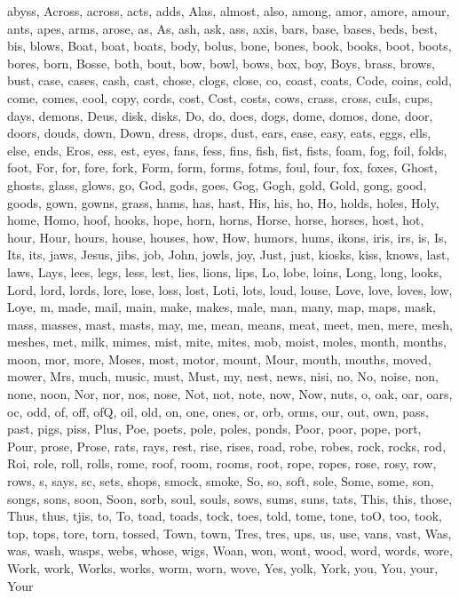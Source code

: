{abyss, Across, across, acts, adds, Alas, almost, also, among, amor, amore, amour, ants, apes, arms, arose, as, As, ash, ask, ass, axis, bars, base, bases, beds, best, bis, blows, Boat, boat, boats, body, bolus, bone, bones, book, books, boot, boots, bores, born, Bosse, both, bout, bow, bowl, bows, box, boy, Boys, brass, brows, bust, case, cases, cash, cast, chose, clogs, close, co, coast, coats, Code, coins, cold, come, comes, cool, copy, cords, cost, Cost, costs, cows, crass, cross, cuIs, cups, days, demons, Deus, disk, disks, Do, do, does, dogs, dome, domos, done, door, doors, douds, down, Down, dress, drops, dust, ears, ease, easy, eats, eggs, ells, else, ends, Eros, ess, est, eyes, fans, fess, fins, fish, fist, fists, foam, fog, foil, folds, foot, For, for, fore, fork, Form, form, forms, fotms, foul, four, fox, foxes, Ghost, ghosts, glass, glows, go, God, gods, goes, Gog, Gogh, gold, Gold, gong, good, goods, gown, gowns, grass, hams, has, hast, His, his, ho, Ho, holds, holes, Holy, home, Homo, hoof, hooks, hope, horn, horns, Horse, horse, horses, host, hot, hour, Hour, hours, house, houses, how, How, humors, hums, ikons, iris, irs, is, Is, Its, its, jaws, Jesus, jibs, job, John, jowls, joy, Just, just, kiosks, kiss, knows, last, laws, Lays, lees, legs, less, lest, lies, lions, lips, Lo, lobe, loins, Long, long, looks, Lord, lord, lords, lore, lose, loss, lost, Loti, lots, loud, louse, Love, love, loves, low, Loye, m, made, mail, main, make, makes, male, man, many, map, maps, mask, mass, masses, mast, masts, may, me, mean, means, meat, meet, men, mere, mesh, meshes, met, milk, mimes, mist, mite, mites, mob, moist, moles, month, months, moon, mor, more, Moses, most, motor, mount, Mour, mouth, mouths, moved, mower, Mrs, much, music, must, Must, my, nest, news, nisi, no, No, noise, non, none, noon, Nor, nor, nos, nose, Not, not, note, now, Now, nuts, o, oak, oar, oars, oc, odd, of, off, ofQ, oil, old, on, one, ones, or, orb, orms, our, out, own, pass, past, pigs, piss, Plus, Poe, poets, pole, poles, ponds, Poor, poor, pope, port, Pour, prose, Prose, rats, rays, rest, rise, rises, road, robe, robes, rock, rocks, rod, Roi, role, roll, rolls, rome, roof, room, rooms, root, rope, ropes, rose, rosy, row, rows, s, says, sc, sets, shops, smock, smoke, So, so, soft, sole, Some, some, son, songs, sons, soon, Soon, sorb, soul, souls, sows, sums, suns, tats, This, this, those, Thus, thus, tjis, to, To, toad, toads, tock, toes, told, tome, tone, toO, too, took, top, tops, tore, torn, tossed, Town, town, Tres, tres, ups, us, use, vans, vast, Was, was, wash, wasps, webs, whose, wigs, Woan, won, wont, wood, word, words, wore, Work, work, Works, works, worm, worn, wove, Yes, yolk, York, you, You, your, Your


}
